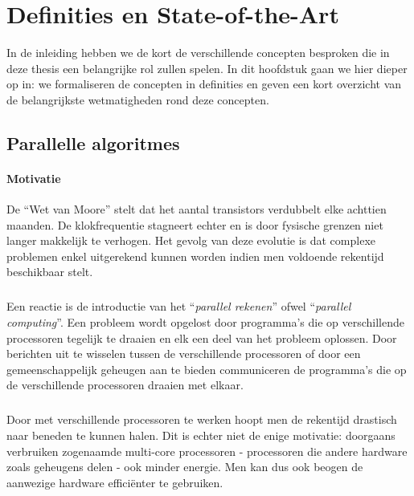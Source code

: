 \chapter{Definities en State-of-the-Art}

In de inleiding hebben we de kort de verschillende concepten besproken die in deze thesis een belangrijke rol zullen spelen. In dit hoofdstuk gaan we hier dieper op in: we formaliseren de concepten in definities en geven een kort overzicht van de belangrijkste wetmatigheden rond deze concepten.

\section{Parallelle algoritmes}

\subsubsection{Motivatie}

De ``Wet van Moore''\cite{4785860} stelt dat het aantal transistors verdubbelt elke achttien maanden. De klokfrequentie stagneert echter en is door fysische grenzen niet langer makkelijk te verhogen. Het gevolg van deze evolutie is dat complexe problemen enkel uitgerekend kunnen worden indien men voldoende rekentijd beschikbaar stelt.

\paragraph{}
Een reactie is de introductie van het ``\emph{parallel rekenen}'' ofwel ``\emph{parallel computing}''. Een probleem wordt opgelost door programma's die op verschillende processoren tegelijk te draaien en elk een deel van het probleem oplossen. Door berichten uit te wisselen tussen de verschillende processoren of door een gemeenschappelijk geheugen aan te bieden communiceren de programma's die op de verschillende processoren draaien met elkaar.

\paragraph{}
Door met verschillende processoren te werken hoopt men de rekentijd drastisch naar beneden te kunnen halen. Dit is echter niet de enige motivatie: doorgaans verbruiken zogenaamde multi-core processoren - processoren die andere hardware zoals geheugens delen - ook minder energie. Men kan dus ook beogen de aanwezige hardware effici\"enter te gebruiken.

